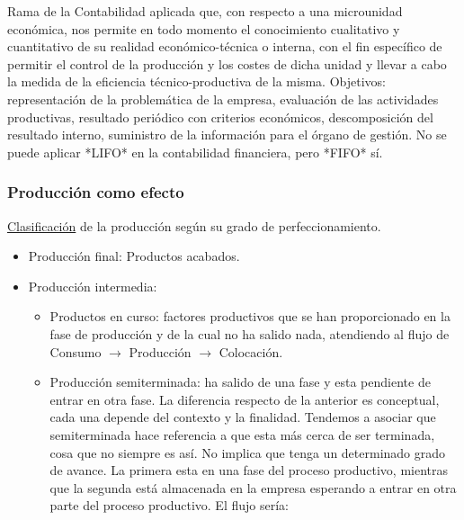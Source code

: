 \documentclass[12pt]{report} %
\providecommand{\tightlist}{%
  \setlength{\itemsep}{0pt}\setlength{\parskip}{0pt}}
\begin{document}

\begin{definicion}
Rama de la Contabilidad aplicada que, con respecto a una microunidad económica, nos permite en todo momento el conocimiento cualitativo y cuantitativo de su realidad económico-técnica o interna, con el fin específico de permitir el control de la producción y los costes de dicha unidad y llevar a cabo la medida de la eficiencia técnico-productiva de la misma. Objetivos: representación de la problemática de la empresa, evaluación de las actividades productivas, resultado periódico con criterios económicos, descomposición del resultado interno, suministro de la información para el órgano de gestión. No se puede aplicar *LIFO* en la contabilidad financiera, pero *FIFO* sí.
\end{definicion}

\subsubsection*{Producción como efecto}

\underline{Clasificación} de la producción según su grado de
perfeccionamiento.

\begin{itemize}
\tightlist
\item
  Producción final: Productos acabados.
\item
  Producción intermedia:

  \begin{itemize}
  \item
    Productos en curso: factores productivos que se han proporcionado en
    la fase de producción y de la cual no ha salido nada, atendiendo al
    flujo de Consumo \(\rightarrow\) Producción \(\rightarrow\)
    Colocación.
  \item
    Producción semiterminada: ha salido de una fase y esta pendiente de
    entrar en otra fase. La diferencia respecto de la anterior es
    conceptual, cada una depende del contexto y la finalidad. Tendemos a
    asociar que semiterminada hace referencia a que esta más cerca de
    ser terminada, cosa que no siempre es así. No implica que tenga un
    determinado grado de avance. La primera esta en una fase del proceso
    productivo, mientras que la segunda está almacenada en la empresa
    esperando a entrar en otra parte del proceso productivo. El flujo
    sería:

  \end{itemize}
\end{itemize}
\end{document}

